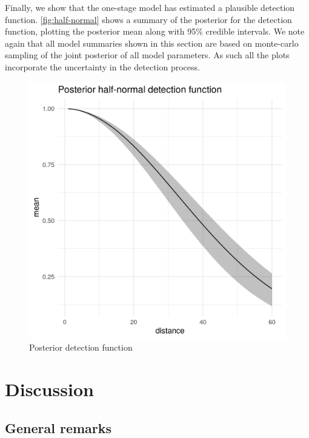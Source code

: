 \documentclass[preprint,12pt]{elsarticle}
\begin{document}
Finally, we show that the one-stage model has estimated a plausible detection function.  \autoref{fig:half-normal} shows a summary of the posterior for the detection function, plotting the posterior mean along with 95\% credible intervals.  We note again that all model summaries shown in this section are based on monte-carlo sampling of the joint posterior of all model parameters.  As such all the plots incorporate the uncertainty in the detection process.  
\begin{figure}
	\includegraphics[scale=0.6]{figures/halfnormal.png}
	\caption{Posterior detection function}
	\label{fig:half-normal}
\end{figure}

\bigskip

\newpage

\section*{Discussion}

\subsection*{General remarks}
\end{document}
